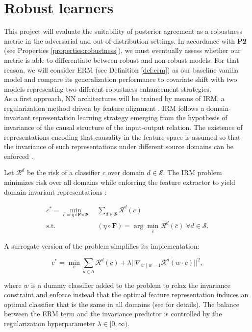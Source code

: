 \section{Robust learners}

This project will evaluate the suitability of posterior agreement as a robustness
metric in the adversarial and out-of-distribution settings. In accordance with
\textbf{P2} (see Properties \ref{properties:robustness}), we must eventually
assess whether our metric is able to differentiate between robust and non-robust
models. For that reason, we will consider ERM (see Definition \ref{def:erm}) as
our baseline vanilla model and compare its generalization performance to covariate
shift with two models representing two different robustness enhancement strategies. \\

As a first approach, NN architectures will be trained by means of IRM, a regularization method driven 
by feature alignment \cite{arjovskyInvariantRiskMinimization2020}.
IRM follows a domain-invariant representation 
learning strategy emerging from the hypothesis of invariance of the 
causal structure of the input-output relation. The existence of 
representations encoding that causality in the feature space is assumed so 
that the invariance of such representations
under different source domains can be enforced
\cite{liuOutOfDistributionGeneralizationSurvey2023}.

\begin{definition}[IRM]
    Let $\mathcal{R}^d$ be the risk of a classifier $c$
    over domain $d \in \mathcal{S}$. The IRM problem minimizes risk over all domains
    while enforcing the feature extractor to yield domain-invariant representations
    \cite{arjovskyInvariantRiskMinimization2020}:

    $$
        \begin{aligned}
            c^* = \min_{c = \eta \circ \bm{F} \circ \Phi} & \; \sum_{d \in \mathcal{S}} \mathcal{R}^d(c) \\
            \text{s.t.} & \; (\eta \circ \bm{F}) = \arg \min_{\bar{c}} \mathcal{R}^d(\bar{c}) \; \forall d \in \mathcal{S}.
        \end{aligned}
    $$

    A surrogate version of the problem simplifies its implementation:

    $$
        c^* = \min_{c} \sum_{d \in \mathcal{S}} \mathcal{R}^d(c) + \lambda || \nabla_{w \mid w = 1} \mathcal{R}^d(w \cdot c) ||^2,
    $$

    where $w$ is a dummy classifier added to the problem to relax the invariance
    constraint and enforce instead that the optimal feature representation induces
    an optimal classifier that is the same in all domains (see
    \cite{arjovskyInvariantRiskMinimization2020} for details). The balance between
    the ERM term and the invariance predictor is controlled by
    the regularization hyperparameter $\lambda \in [0, \infty)$.
\end{definition}

